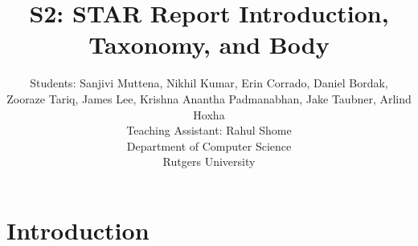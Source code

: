 \documentclass[tog]{acmsiggraph}
\title{S2: STAR Report Introduction, Taxonomy, and Body}
\author{Students: %
 Sanjivi Muttena\emailfoot{sanjivi.muttena@rutgers.edu}, %
 Nikhil Kumar\emailfoot{nikhilkumar516@gmail.com}, %
 Erin Corrado\emailfoot{e.corrado144@gmail.com}, %
 Daniel Bordak\emailfoot{dbordak@fastmail.fm},%
 \\Zooraze Tariq\emailfoot{zooraze@gmail.com}, %
 James Lee\emailfoot{yl50@scarletmail.rutgers.edu}, %
 Krishna Anantha Padmanabhan\emailfoot{krishna.ananth@rutgers.edu}, %
 Jake Taubner\emailfoot{jdt97@scarletmail.rutgers.edu}, %
 Arlind Hoxha\emailfoot{ah621@scarletmail.rutgers.edu}%
 \\Teaching Assistant: Rahul Shome\emailfoot{rahulshome.in@gmail.com}%
 \\Department of Computer Science%
 \\Rutgers University}
\begin{document}
\maketitle


\begin{abstract}

\paragraph{}



\end{abstract}


\keywordlist
\setlength{\parskip}{0pt}
\setlength{\parindent}{10pt}

\section{Introduction}
\end{document}
